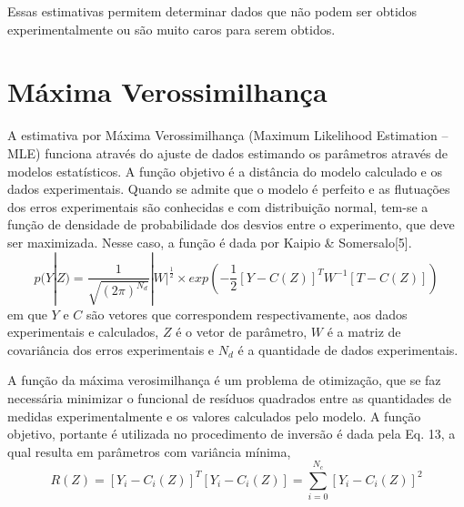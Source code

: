 \documentclass[por]{Template_SBEF}
\begin{document}
Essas estimativas permitem determinar dados que não podem ser obtidos experimentalmente ou são muito caros para serem obtidos.
\section{Máxima Verossimilhança}
A estimativa por Máxima Verossimilhança (Maximum Likelihood Estimation – MLE) funciona através do ajuste de dados estimando os parâmetros através de modelos estatísticos. A função objetivo é a distância do modelo calculado e os dados experimentais. Quando se admite que o modelo é perfeito e as flutuações dos erros experimentais são conhecidas e com distribuição normal, tem-se a função de densidade de probabilidade dos desvios entre o experimento, que deve ser maximizada. Nesse caso, a função é dada por Kaipio \& Somersalo[5].
\begin{equation}
p(Y|Z)= \frac{1}{\sqrt{(2\pi)^{N_d}}}|W|^\frac{1}{2}\times exp(-\frac{1}{2}[Y-C(Z)]^T W^{-1}[T-C(Z)])
\end{equation}
em que $Y$ e $C$ são vetores que correspondem respectivamente, aos dados experimentais e calculados, $Z$ é o vetor de parâmetro, $W$ é a matriz de covariância dos erros experimentais e $N_d$ é a quantidade de dados experimentais.

A função da máxima verosimilhança é um problema de otimização, que se faz necessária minimizar o funcional de resíduos quadrados entre as quantidades de medidas experimentalmente e os valores calculados pelo modelo. A função objetivo, portante é utilizada no procedimento de inversão é dada pela Eq. 13, a qual resulta em parâmetros com variância mínima,
\begin{equation}
R(Z) = [Y_i - C_i(Z)]^T [Y_i - C_i (Z)] = \sum_{i=0}^{N_c}[Y_i - C_i(Z)]^2
\end{equation}
\end{document}
